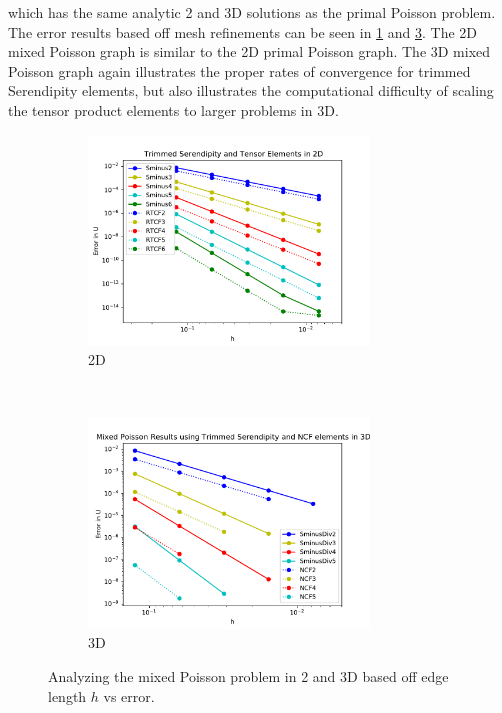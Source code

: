 \documentclass[manuscript,screen]{acmart}
\begin{document}
\noindent which has the same analytic 2 and 3D solutions as the primal Poisson problem.  The error results based off mesh refinements can be seen in \ref{fig:2dMixedPoissonH} and \ref{fig:3dMixedPoissonH}.  The 2D mixed Poisson graph is similar to the 2D primal Poisson graph.  The 3D mixed Poisson graph again illustrates the proper rates of convergence for trimmed Serendipity elements, but also illustrates the computational difficulty of scaling the tensor product elements to larger problems in 3D.

\begin{figure}[h!]
  \centering
  \begin{subfigure}[h]{0.5\textwidth}
    \centering
    \includegraphics[height=2.2in]{2dMixedPoissonH.pdf}
    \caption{2D}
    \label{fig:2dMixedPoissonH}
  \end{subfigure}
  ~
  \begin{subfigure}[h]{0.5\textwidth}
    \centering
    \includegraphics[height=2.2in]{3dMixedPoissonH.pdf}
    \caption{3D}
    \label{fig:3dMixedPoissonH}
  \end{subfigure}
  \caption{Analyzing the mixed Poisson problem in 2 and 3D based off edge length $h$ vs error.}
\end{figure} 

\end{document}
